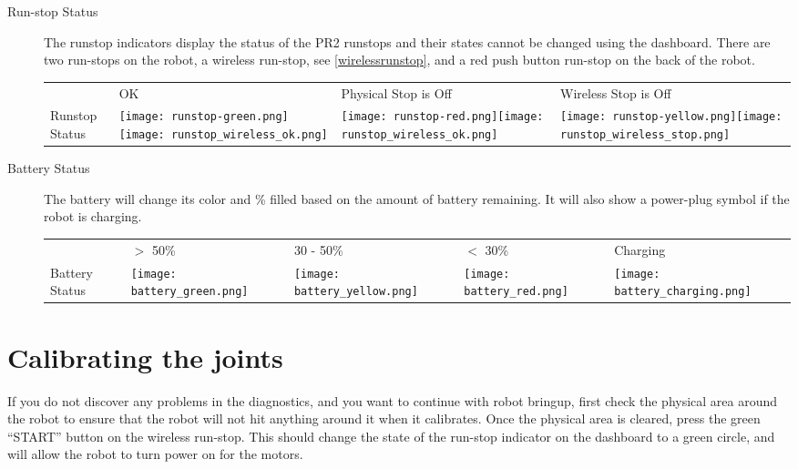 \begin{description}
\item[Run-stop Status] The runstop indicators display the status of the PR2 runstops and their states cannot be changed using the dashboard. 
There are two run-stops on the robot, a wireless run-stop, see \ref{wirelessrunstop}, and a red push button run-stop on the back of the robot.\\

    \begin{tabular}{m{2.6cm}SSS}
     & OK & Physical Stop is Off & Wireless Stop is Off\\
    Runstop Status & \texttt{[image: runstop-green.png]}\texttt{[image: runstop\_wireless\_ok.png]}&
                     \texttt{[image: runstop-red.png]}\texttt{[image: runstop\_wireless\_ok.png]}&
                     \texttt{[image: runstop-yellow.png]}\texttt{[image: runstop\_wireless\_stop.png]}\\
   \end{tabular}

\item[Battery Status]
The battery will change its color and \% filled based on the amount of battery remaining. It will also show a power-plug symbol if the robot is charging.
                                                                                                                      
    \begin{tabular}{m{2.5cm}SSSS}
     & $>$ 50\% & 30 - 50\% & $<$ 30\% & Charging\\
    Battery Status & \texttt{[image: battery\_green.png]}&
                     \texttt{[image: battery\_yellow.png]}&
                     \texttt{[image: battery\_red.png]}&
                     \texttt{[image: battery\_charging.png]}\\
   \end{tabular}


\end{description}

\section{Calibrating the joints}
If you do not discover any problems in the diagnostics, and you want to continue with robot bringup, first check the physical area around the robot to ensure that the robot will not hit anything around it when it calibrates. Once the physical area is cleared, press the green 
``START'' button on the wireless run-stop.  This should change the state of the run-stop indicator on the dashboard to a green 
circle, and will allow the robot to turn power on for the motors.

